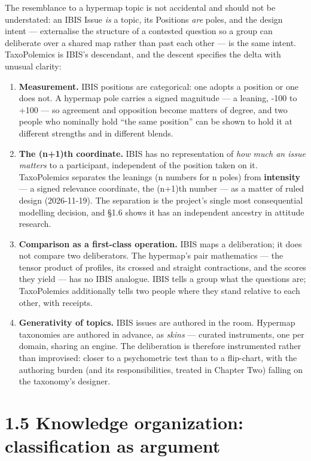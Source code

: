 The resemblance to a hypermap topic is not accidental and should not be
understated: an IBIS Issue \emph{is} a topic, its Positions \emph{are}
poles, and the design intent --- externalise the structure of a
contested question so a group can deliberate over a shared map rather
than past each other --- is the same intent. TaxoPolemics is IBIS's
descendant, and the descent specifies the delta with unusual clarity:

\begin{enumerate}
\def\labelenumi{\arabic{enumi}.}
\tightlist
\item
  \textbf{Measurement.} IBIS positions are categorical: one adopts a
  position or one does not. A hypermap pole carries a signed magnitude
  --- a leaning, -100 to +100 --- so agreement and opposition become
  matters of degree, and two people who nominally hold ``the same
  position'' can be shown to hold it at different strengths and in
  different blends.
\item
  \textbf{The (n+1)th coordinate.} IBIS has no representation of
  \emph{how much an issue matters} to a participant, independent of the
  position taken on it. TaxoPolemics separates the leanings (n numbers
  for n poles) from \textbf{intensity} --- a signed relevance
  coordinate, the (n+1)th number --- as a matter of ruled design
  (2026-11-19). The separation is the project's single most
  consequential modelling decision, and \S 1.6 shows it has an independent
  ancestry in attitude research.
\item
  \textbf{Comparison as a first-class operation.} IBIS maps a
  deliberation; it does not compare two deliberators. The hypermap's
  pair mathematics --- the tensor product of profiles, its crossed and
  straight contractions, and the scores they yield --- has no IBIS
  analogue. IBIS tells a group what the questions are; TaxoPolemics
  additionally tells two people where they stand relative to each other,
  with receipts.
\item
  \textbf{Generativity of topics.} IBIS issues are authored in the room.
  Hypermap taxonomies are authored in advance, as \emph{skins} ---
  curated instruments, one per domain, sharing an engine. The
  deliberation is therefore instrumented rather than improvised: closer
  to a psychometric test than to a flip-chart, with the authoring burden
  (and its responsibilities, treated in Chapter Two) falling on the
  taxonomy's designer.
\end{enumerate}

\section{1.5 Knowledge organization: classification as
argument}\label{knowledge-organization-classification-as-argument}

